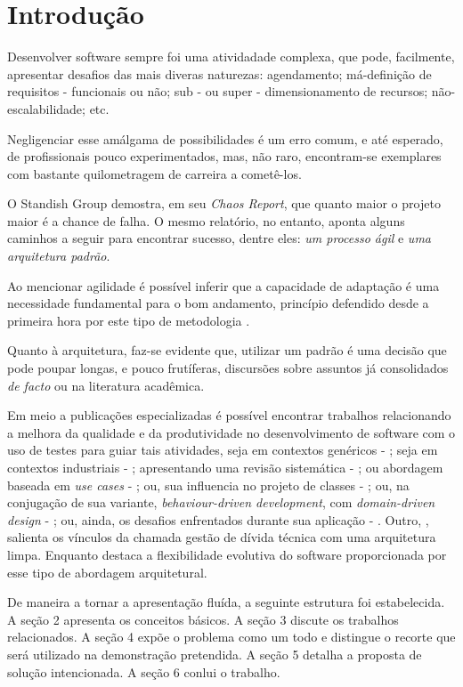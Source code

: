 \section{Introdução}

  Desenvolver software sempre foi uma atividadade complexa, que pode, facilmente,  apresentar desafios das mais diveras naturezas: agendamento; má-definição de  requisitos - funcionais ou não; sub - ou super - dimensionamento de recursos; não-escalabilidade; etc.

  Negligenciar esse amálgama de possibilidades é um erro comum, e até esperado, de profissionais pouco experimentados, mas, não raro, encontram-se exemplares com bastante quilometragem de carreira a cometê-los.

  O Standish Group demostra, em seu \emph{Chaos Report}\cite{ChaosReport2015}, que quanto maior o projeto maior é a chance de falha. O mesmo relatório, no entanto, aponta alguns caminhos a seguir para encontrar sucesso, dentre eles: \emph{um processo ágil} e \emph{uma arquitetura padrão}.

  Ao mencionar agilidade é possível inferir que a capacidade de adaptação é uma  necessidade fundamental para o bom andamento, princípio defendido desde a  primeira hora por este tipo de metodologia \cite{ManifestoAgil2001}.

  Quanto à arquitetura, faz-se evidente que, utilizar um padrão é uma decisão que pode poupar longas, e pouco frutíferas, discursões sobre assuntos já consolidados \emph{de facto} ou na literatura acadêmica.

  Em meio a publicações especializadas é possível encontrar trabalhos relacionando a melhora da qualidade e da produtividade no desenvolvimento de software com o uso de testes para guiar tais atividades, seja em contextos genéricos - \cite{Aguilar2016}; seja em contextos industriais - \cite{Gustavsson2017}; apresentando uma revisão sistemática - \cite{Benato2021}; ou abordagem baseada em \emph{use cases} - \cite{Milanez2014}; ou, sua influencia no projeto de classes - \cite{Aniche2012}; ou, na conjugação de sua variante, \emph{behaviour-driven development}, com \emph{domain-driven design} - \cite{Santos2015}; ou, ainda, os desafios enfrentados durante sua aplicação - \cite{Adhikari2019}. Outro, \cite{Beltrao2020}, salienta os vínculos da chamada gestão de dívida técnica com uma arquitetura limpa. Enquanto  destaca a flexibilidade evolutiva do software proporcionada por esse tipo de abordagem arquitetural.

  De maneira a tornar a apresentação fluída, a seguinte estrutura foi estabelecida. A seção 2 apresenta os conceitos básicos. A seção 3 discute os trabalhos relacionados. A seção 4 expõe o problema como um todo e distingue o recorte que será utilizado na demonstração pretendida. A seção 5 detalha a proposta de solução intencionada. A seção 6 conlui o trabalho.
